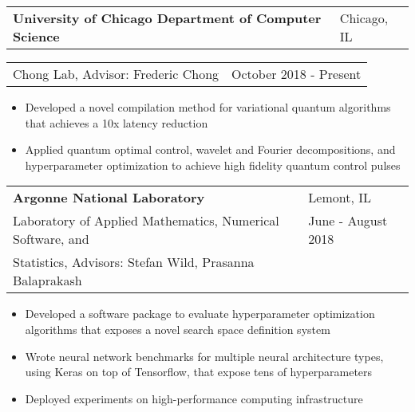 \documentclass[letterpaper, 12pt]{article}
\begin{document}
\begin{tabular}{@{} L{12cm} @{} R{4.51cm} @{}}
  \textbf{University of Chicago Department of Computer Science} & Chicago, IL \\
\end{tabular}
\begin{tabular}{@{} L{11cm} @{} R{5.51cm} @{}}
  Chong Lab, Advisor: Frederic Chong & October 2018 - Present \\
\end{tabular}
\vspace{-15pt}
\begin{itemize}
  \item Developed a novel compilation method for variational quantum algorithms that achieves a 10x latency reduction
  \item Applied quantum optimal control, wavelet and Fourier decompositions, and hyperparameter optimization to achieve high fidelity quantum control pulses
\end{itemize}

\begin{tabular}{@{} L{12cm} @{} R{4.51cm} @{}}
  \textbf{Argonne National Laboratory} & Lemont, IL \\
  Laboratory of Applied Mathematics, Numerical Software, and & June - August 2018 \\
  Statistics, Advisors: Stefan Wild, Prasanna Balaprakash & \\
\end{tabular}
\vspace{-10pt}
\begin{itemize}
  \item Developed a software package to evaluate hyperparameter optimization algorithms that exposes a novel search space definition system
  \item Wrote neural network benchmarks for multiple neural architecture types, using Keras on top of Tensorflow, that expose tens of hyperparameters%
  \item Deployed experiments on high-performance computing infrastructure 
\end{itemize}
\vspace{5pt}
\end{document}
